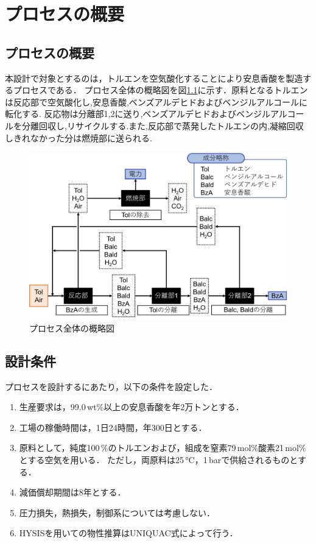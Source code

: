 \documentclass[a4j]{jsreport}
\begin{document}
\chapter{プロセスの概要}
\section{プロセスの概要}
本設計で対象とするのは，トルエンを空気酸化することにより安息香酸を製造するプロセスである．
プロセス全体の概略図を図\ref{プロセス全体の概略図}に示す．原料となるトルエンは反応部で空気酸化し,安息香酸,ベンズアルデヒドおよびベンジルアルコールに転化する.
反応物は分離部1,2に送り,ベンズアルデヒドおよびベンジルアルコールを分離回収し,リサイクルする.また,反応部で蒸発したトルエンの内,凝縮回収しきれなかった分は燃焼部に送られる.
\begin{figure}[htbp]
  \centering
  \includegraphics[scale=0.6]{processOutline.png}
  \caption{プロセス全体の概略図}
  \label{プロセス全体の概略図}
\end{figure}

\section{設計条件}
プロセスを設計するにあたり，以下の条件を設定した．
\begin{enumerate}
  \item 生産要求は，99.0\,wt\%以上の安息香酸を年2万トンとする．\\
  \item 工場の稼働時間は，1日24時間，年300日とする．\\
  \item 原料として，純度100\,\%のトルエンおよび，組成を窒素79\,mol\%酸素21\,mol\%とする空気を用いる．
           ただし，両原料は25\,\si{\degreeCelsius}，1\,\si{\bar}で供給されるものとする．\\
  \item 減価償却期間は8年とする．\\
  \item 圧力損失，熱損失，制御系については考慮しない．\\
  \item HYSISを用いての物性推算はUNIQUAC式によって行う．
\end{enumerate}
\end{document}
